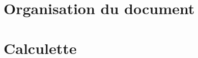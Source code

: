 
\section{Organisation du document}\label{premiers-pas:organisation}

\section{Calculette \python}\label{premiers-pas:calculette-python}


